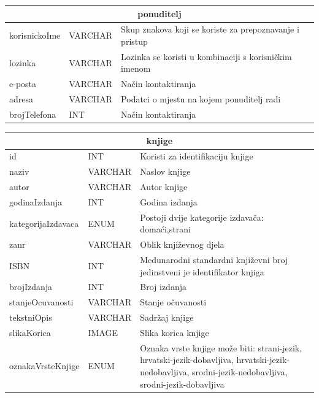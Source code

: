 			\begin{center}
				\vspace{1cm}
				\begin{tabular}{ |p{4cm}|p{3cm}|p{5cm}|  }
					\hline
					\multicolumn{3}{|c|}{\textbf{ponuditelj}} \\
					\bottomrule[2pt]
					\cellcolor{green!25}korisnickoIme & VARCHAR &Skup znakova koji se koriste za prepoznavanje i pristup\\
					\hline
					lozinka & VARCHAR & Lozinka se koristi u kombinaciji s korisničkim imenom\\
					\hline
					e-posta & VARCHAR & Način kontaktiranja\\
					\hline
					adresa & VARCHAR & Podatci o mjestu na kojem ponuditelj radi\\
					\hline
					brojTelefona & INT & Način kontaktiranja\\
					\hline
				\end{tabular}
				\vspace{1cm}
				\begin{tabular}{ |p{4cm}|p{3cm}|p{5cm}|  }
					\hline
					\multicolumn{3}{|c|}{\textbf{knjige}} \\
					\bottomrule[2pt]
					\cellcolor{green!25}id & INT &Koristi za identifikaciju knjige\\
					\hline
					naziv & VARCHAR & Naslov knjige\\
					\hline
					autor & VARCHAR & Autor knjige\\
					\hline
					godinaIzdanja & INT & Godina izdanja\\
					\hline
					kategorijaIzdavaca & ENUM & Postoji dvije kategorije izdavača: domaći,strani\\
					\hline
					zanr & VARCHAR & Oblik književnog djela\\
					\hline
					ISBN & INT & Medunarodni standardni književni broj jedinstveni je identifikator knjiga\\
					\hline
					brojIzdanja & INT & Broj izdanja\\
					\hline
					stanjeOcuvanosti & VARCHAR & Stanje očuvanosti\\
					\hline
					tekstniOpis & VARCHAR & Sadržaj knjige\\
					\hline
					slikaKorica & IMAGE & Slika korica knjige\\
					\hline
					oznakaVrsteKnjige & ENUM & Oznaka vrste knjige može biti: strani-jezik, hrvatski-jezik-dobavljiva, hrvatski-jezik-nedobavljiva, srodni-jezik-nedobavljiva, srodni-jezik-dobavljiva\\

\end{tabular}
\end{center}
